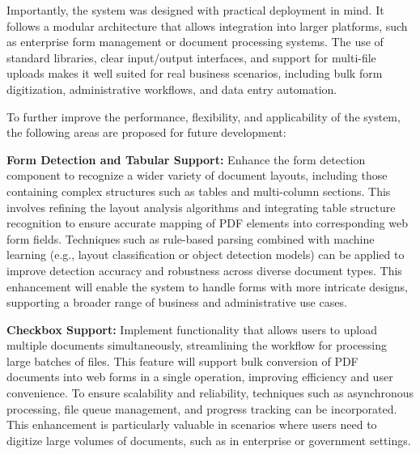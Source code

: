 \documentclass[12pt,oneside,openright,a4paper]{cpe-english-project}
\begin{document}
Importantly, the system was designed with practical deployment in mind. It follows a modular architecture that allows integration into larger platforms, such as enterprise form management or document processing systems. The use of standard libraries, clear input/output interfaces, and support for multi-file uploads makes it well suited for real business scenarios, including bulk form digitization, administrative workflows, and data entry automation.

To further improve the performance, flexibility, and applicability of the system, the following areas are proposed for future development:

\textbf{Form Detection and Tabular Support:}
Enhance the form detection component to recognize a wider variety of document layouts, including those containing complex structures such as tables and multi-column sections. This involves refining the layout analysis algorithms and integrating table structure recognition to ensure accurate mapping of PDF elements into corresponding web form fields. Techniques such as rule-based parsing combined with machine learning (e.g., layout classification or object detection models) can be applied to improve detection accuracy and robustness across diverse document types. This enhancement will enable the system to handle forms with more intricate designs, supporting a broader range of business and administrative use cases.

\textbf{Checkbox Support:}
Implement functionality that allows users to upload multiple documents simultaneously, streamlining the workflow for processing large batches of files. This feature will support bulk conversion of PDF documents into web forms in a single operation, improving efficiency and user convenience. To ensure scalability and reliability, techniques such as asynchronous processing, file queue management, and progress tracking can be incorporated. This enhancement is particularly valuable in scenarios where users need to digitize large volumes of documents, such as in enterprise or government settings.



\makeatletter
\g@addto@macro{\UrlBreaks}{\UrlOrds}
\makeatother
% 



\end{document}
